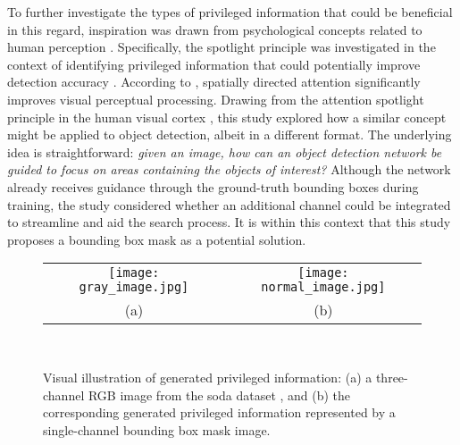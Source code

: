 To further investigate the types of privileged information that could be beneficial in this regard, inspiration was drawn from psychological concepts related to human perception \cite{itti_ior, spotlight}. Specifically, the spotlight principle was investigated in the context of identifying privileged information that could potentially improve detection accuracy \cite{spotlight}. According to \cite{spotlight}, spatially directed attention significantly improves visual perceptual processing. Drawing from the attention spotlight principle in the human visual cortex \cite{spotlight}, this study explored how a similar concept might be applied to object detection, albeit in a different format. The underlying idea is straightforward: \textit{given an image, how can an object detection network be guided to focus on areas containing the objects of interest?}
Although the network already receives guidance through the ground-truth bounding boxes during training, the study considered whether an additional channel could be integrated to streamline and aid the search process. It is within this context that this study proposes a bounding box mask as a potential solution.

\begin{figure}[!htbp]
  \centering
  \begin{tabular}{cc}
    \texttt{[image: gray\_image.jpg]} &
    \texttt{[image: normal\_image.jpg]} \\
    \small (a) & \small (b) \\
  \end{tabular}\\
  \caption{Visual illustration of generated privileged information: (a) a three-channel RGB image from the \gls{soda} dataset \cite{soda_dataset}, and (b) the corresponding generated privileged information represented by a single-channel bounding box mask image.}
  \label{fig:privileged_visual}
\end{figure}


